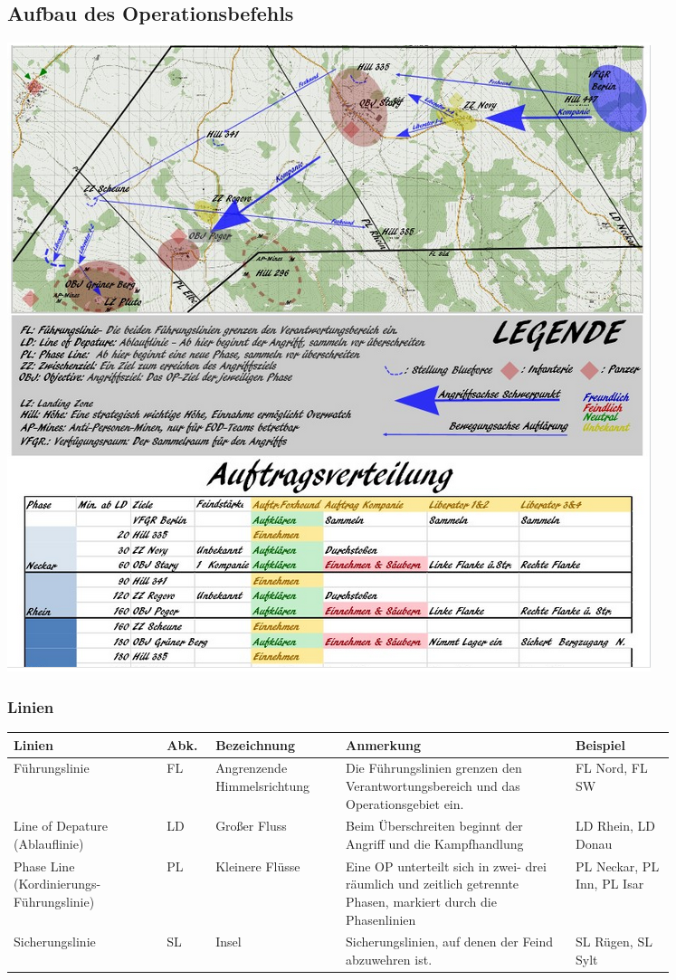 \pagebreak
\subsection{Aufbau des Operationsbefehls}
\label{OPbef}

\begin{minipage}[t]{1\textwidth}
	\includegraphics[width=\textwidth]{./img/fortgeschrittenes/karteUndMarkierungen/OP-Befehl.png}
\end{minipage}

\subsubsection{Linien}
\begin{longtable}{|p{0.2\linewidth}|p{0.05\linewidth}|p{0.17\linewidth}|p{0.3\linewidth}|p{0.13\linewidth}|} 	
	\hline
	Linien	&	Abk.	&	Bezeichnung		&	Anmerkung 	&	Beispiel \\ 
	\hline
	Führungslinie	&	FL	&	Angrenzende Himmelsrichtung	&	Die Führungslinien grenzen  den Verantwortungsbereich und das Operationsgebiet ein. & FL Nord, FL SW \\ 
	\hline
	Line of Depature (Ablauflinie)	&	LD	&	Großer Fluss	&	Beim Überschreiten beginnt der Angriff und die Kampfhandlung 	&	LD Rhein, LD Donau	\\ 
	\hline
	Phase Line (Kordinierungs-Führungslinie) & PL	&	Kleinere Flüsse	&	Eine OP unterteilt sich in zwei- drei räumlich und zeitlich getrennte Phasen, markiert durch die Phasenlinien	& PL Neckar, PL Inn, PL Isar	\\ 
	\hline
	Sicherungslinie 	&	SL 	&	Insel	&	Sicherungslinien, auf denen der Feind abzuwehren ist.	&	SL Rügen, SL Sylt	\\ 
	\hline
\end{longtable}

